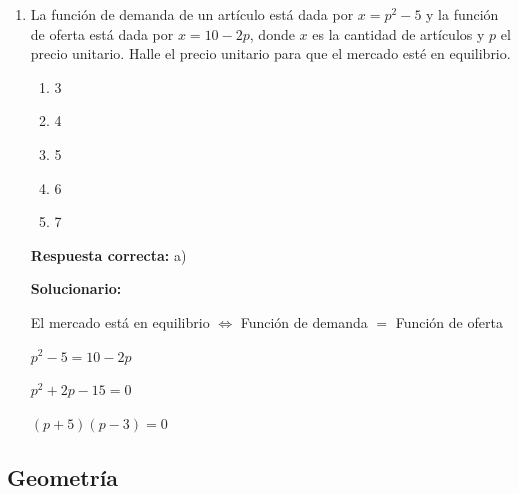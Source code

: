 \begin{enumerate}[resume]
	\vspace{2mm}
	\textbf{Solucionario:}
	
	$\dfrac{13m+1}{m+1}=\dfrac{8m+2}{m}$
	
	$13m^2+m=8m^2+10m+2$
	
	$5m^2-9m-2=0$
	
	$(5m+1) y (m-2) $
	
	
	$m=-\dfrac{1}{5}\ \ \ y\ \ \fbox{m=2}$
	
	\vspace{6mm}
	
	\item La función de demanda de un artículo está dada por $x=p^2-5$ y la función de oferta está dada por $x=10-2p$, donde $x$ es la cantidad de artículos y $p$ el precio unitario. Halle el precio unitario para que el mercado esté en equilibrio.
	
	\begin{enumerate}[label=\alph*)]
		\item 3
		\item 4
		\item 5
		\item 6
		\item 7
	\end{enumerate}
	\textbf{Respuesta correcta:} a)
	
	\vspace{2mm}
	\textbf{Solucionario:}
	
	El mercado está en equilibrio $\Leftrightarrow$ Función de demanda $=$ Función de oferta
	
	$p^2-5=10-2p$
	
	$p^2+2p-15=0$
	
	$(p+5)(p-3)=0$
	
	
	\vspace{6mm}
	
\end{enumerate}




\subsection*{Geometría}

